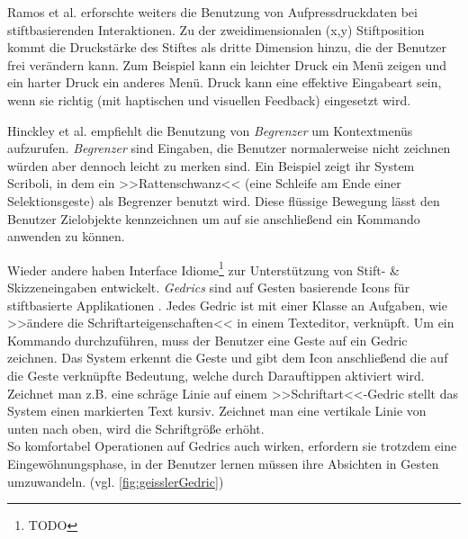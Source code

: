 \medskip Ramos et al. \citep{Ramos:2004} erforschte weiters die Benutzung von Aufpressdruckdaten bei stiftbasierenden Interaktionen. Zu der zweidimensionalen (x,y) Stiftposition kommt die Druckstärke des Stiftes als dritte Dimension hinzu, die der Benutzer frei verändern kann. Zum Beispiel kann ein leichter Druck ein Menü zeigen und ein harter Druck ein anderes Menü. Druck kann eine effektive Eingabeart sein, wenn sie richtig (mit haptischen und visuellen Feedback) eingesetzt wird.

\medskip Hinckley et al. \citep{Hinckley:2005} empfiehlt die Benutzung von \emph{Begrenzer} um Kontextmenüs aufzurufen. \emph{Begrenzer} sind Eingaben, die Benutzer normalerweise nicht zeichnen würden aber dennoch leicht zu merken sind. Ein Beispiel zeigt ihr System Scriboli, in dem ein >>Rattenschwanz<< (eine Schleife am Ende einer Selektionsgeste) als Begrenzer benutzt wird. Diese flüssige Bewegung lässt den Benutzer Zielobjekte kennzeichnen um auf sie anschließend ein Kommando anwenden zu können.

\medskip Wieder andere haben Interface Idiome\footnote{TODO} zur Unterstützung von Stift- \& Skizzeneingaben entwickelt. \emph{Gedrics} sind auf Gesten basierende Icons für stiftbasierte Applikationen \citep{Geissler:1995}. Jedes Gedric ist mit einer Klasse an Aufgaben, wie >>ändere die Schriftarteigenschaften<< in einem Texteditor, verknüpft. Um ein Kommando durchzuführen, muss der Benutzer eine Geste auf ein Gedric zeichnen. Das System erkennt die Geste und gibt dem Icon anschließend die auf die Geste verknüpfte Bedeutung, welche durch Darauftippen aktiviert wird. Zeichnet man z.B. eine schräge Linie auf einem >>Schriftart<<-Gedric stellt das System einen markierten Text kursiv. Zeichnet man eine vertikale Linie von unten nach oben, wird die Schriftgröße erhöht. \\ So komfortabel Operationen auf Gedrics auch wirken, erfordern sie trotzdem eine Eingewöhnungsphase, in der Benutzer lernen müssen ihre Absichten in Gesten umzuwandeln. (vgl. \autoref{fig:geisslerGedric}) 

